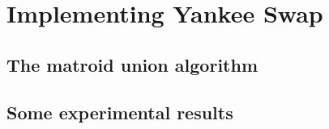 \chapter{Implementing Yankee Swap}
\skelpar
\section{The matroid union algorithm}
\skelpar
\section{Some experimental results}
\skelpar